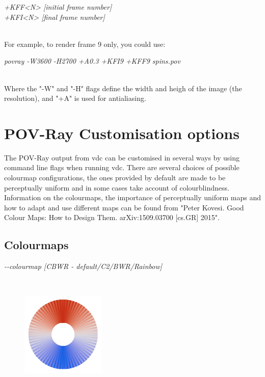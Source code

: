 \begin{minipage}[c]{\textwidth}
\centering
\textit{+KFF<N> [initial frame number]\\
+KFI<N> [final frame number]}
\end{minipage}\\

For example, to render frame 9 only, you could use:

\begin{minipage}[c]{\textwidth}
\centering
\textit{povray -W3600 -H2700 +A0.3 +KFI9 +KFF9 spins.pov}
\end{minipage}\\

Where the "-W" and "-H" flags define the width and heigh of the image (the resolution), and "+A" is used for antialiasing. \\

\section*{POV-Ray Customisation options}
The POV-Ray output from vdc can be customised in several ways by using command line flags when running vdc. There are several choices of possible colourmap configurations, the ones provided by default are made to be perceptually uniform and in some cases take account of colourblindness. Information on the colourmaps, the importance of perceptually uniform maps and how to adapt and use different maps can be found from "Peter Kovesi. Good Colour Maps: How to Design Them. arXiv:1509.03700 [cs.GR] 2015". \\

\subsection*{Colourmaps}

\begin{minipage}[c]{\textwidth}
\centering
\textit{-{}-colourmap [CBWR - default/C2/BWR/Rainbow]}
\end{minipage}\\

\begin{figure}[!h]
\center
\includegraphics[width=4cm]{figures/CBWR_colourmap.jpg}
\label{fig:CBWR_colourmap}
\end{figure}

